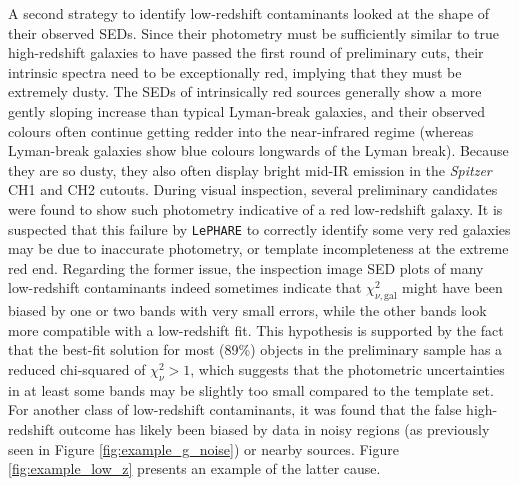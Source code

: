 A second strategy to identify low-redshift contaminants looked at the shape of their observed SEDs. Since their photometry must be sufficiently similar to true high-redshift galaxies to have passed the first round of preliminary cuts, their intrinsic spectra need to be exceptionally red, implying that they must be extremely dusty. The SEDs of intrinsically red sources generally show a more gently sloping increase than typical Lyman-break galaxies, and their observed colours often continue getting redder into the near-infrared regime (whereas Lyman-break galaxies show blue colours longwards of the Lyman break). Because they are so dusty, they also often display bright mid-IR emission in the \textit{Spitzer} CH1 and CH2 cutouts. During visual inspection, several preliminary candidates were found to show such photometry indicative of a red low-redshift galaxy. It is suspected that this failure by \texttt{LePHARE} to correctly identify some very red galaxies may be due to inaccurate photometry, or template incompleteness at the extreme red end. Regarding the former issue, the inspection image SED plots of many low-redshift contaminants indeed sometimes indicate that $\chi^2_{\nu,\mathrm{gal}}$ might have been biased by one or two bands with very small errors, while the other bands look more compatible with a low-redshift fit. This hypothesis is supported by the fact that the best-fit solution for most (89\%) objects in the preliminary sample has a reduced chi-squared of $\chi_{\nu}^2>1$, which suggests that the photometric uncertainties in at least some bands may be slightly too small compared to the template set. For another class of low-redshift contaminants, it was found that the false high-redshift outcome has likely been biased by data in noisy regions (as previously seen in Figure \ref{fig:example_g_noise}) or nearby sources. Figure \ref{fig:example_low_z} presents an example of the latter cause. \par


